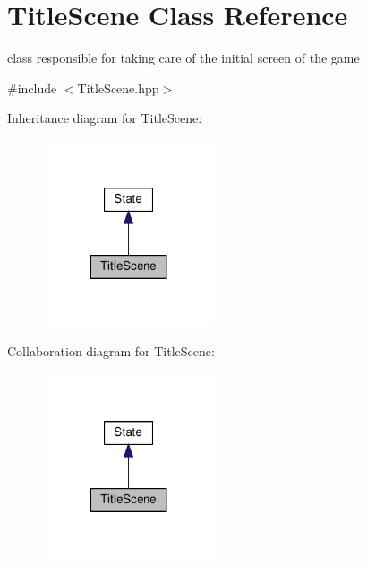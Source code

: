 \hypertarget{classTitleScene}{}\section{Title\+Scene Class Reference}
\label{classTitleScene}


class responsible for taking care of the initial screen of the game  




{\ttfamily \#include $<$Title\+Scene.\+hpp$>$}



Inheritance diagram for Title\+Scene\+:
\nopagebreak
\begin{figure}[H]
\begin{center}
\leavevmode
\includegraphics[width=143pt]{classTitleScene__inherit__graph}
\end{center}
\end{figure}


Collaboration diagram for Title\+Scene\+:
\nopagebreak
\begin{figure}[H]
\begin{center}
\leavevmode
\includegraphics[width=143pt]{classTitleScene__coll__graph}
\end{center}
\end{figure}
